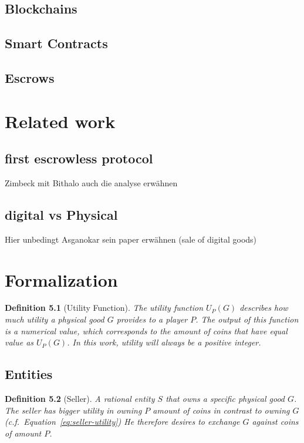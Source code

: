 \documentclass{cacthesis}
\newtheorem{definition}{Definition}
\begin{document}
\section{Blockchains}
\section{Smart Contracts}
\section{Escrows}

\chapter{Related work}
\section{first escrowless protocol}
Zimbeck mit Bithalo
auch die analyse erwähnen
\section{digital vs Physical}
Hier unbedingt Asganokar sein paper erwähnen (sale of digital goods)

\chapter{Formalization}

\begin{definition}[Utility Function]
\label{def:utility-function}
The utility function $U_P(G)$ describes how much utility a physical good $G$ provides to a player $P$. The output of this function is a numerical value, which corresponds to the amount of coins that have equal value as $U_P(G)$. In this work, utility will always be a positive integer.
\end{definition}

\section{Entities}

\begin{definition}[Seller]
\label{def:seller}
A rational entity $S$ that owns a specific physical good $G$. The seller
has bigger utility in owning $P$ amount of coins in contrast to owning $G$ (c.f.~Equation~\ref{eq:seller-utility}) He therefore desires to exchange $G$ against coins of amount $P$.
\end{definition}
\end{document}
